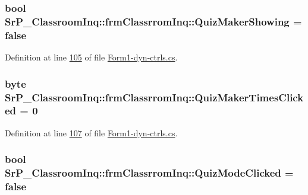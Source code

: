 \hypertarget{class_sr_p___classroom_inq_1_1frm_classrrom_inq_a527e6e32ab67073ccbdb94297399ab2d}{
\subsubsection[{\-Quiz\-Maker\-Showing}]{\setlength{\rightskip}{0pt plus 5cm}bool {\bf \-Sr\-P\-\_\-\-Classroom\-Inq\-::frm\-Classrrom\-Inq\-::\-Quiz\-Maker\-Showing} = false}}
\label{class_sr_p___classroom_inq_1_1frm_classrrom_inq_a527e6e32ab67073ccbdb94297399ab2d}


\-Definition at line \hyperlink{_form1-dyn-ctrls_8cs_source_l00105}{105} of file \hyperlink{_form1-dyn-ctrls_8cs_source}{\-Form1-\/dyn-\/ctrls.\-cs}.

\hypertarget{class_sr_p___classroom_inq_1_1frm_classrrom_inq_ae28b52f195f8e33470bb7bbc988ba622}{
\subsubsection[{\-Quiz\-Maker\-Times\-Clicked}]{\setlength{\rightskip}{0pt plus 5cm}byte {\bf \-Sr\-P\-\_\-\-Classroom\-Inq\-::frm\-Classrrom\-Inq\-::\-Quiz\-Maker\-Times\-Clicked} = 0}}
\label{class_sr_p___classroom_inq_1_1frm_classrrom_inq_ae28b52f195f8e33470bb7bbc988ba622}


\-Definition at line \hyperlink{_form1-dyn-ctrls_8cs_source_l00107}{107} of file \hyperlink{_form1-dyn-ctrls_8cs_source}{\-Form1-\/dyn-\/ctrls.\-cs}.

\hypertarget{class_sr_p___classroom_inq_1_1frm_classrrom_inq_af09c14bf56f313348d1e4a533fe515bf}{
\subsubsection[{\-Quiz\-Mode\-Clicked}]{\setlength{\rightskip}{0pt plus 5cm}bool {\bf \-Sr\-P\-\_\-\-Classroom\-Inq\-::frm\-Classrrom\-Inq\-::\-Quiz\-Mode\-Clicked} = false}}
\label{class_sr_p___classroom_inq_1_1frm_classrrom_inq_af09c14bf56f313348d1e4a533fe515bf}


